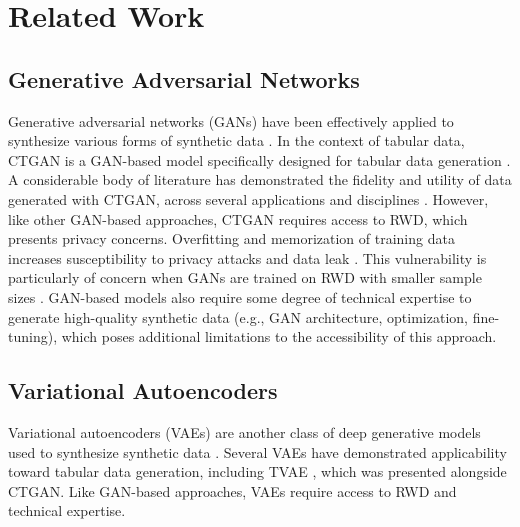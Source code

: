 \section{Related Work}
\subsection{Generative Adversarial Networks}
Generative adversarial networks (GANs) \cite{Goodfellow2014} have been effectively applied to synthesize various forms of synthetic data \cite{Figueira2022, Yi2019}. In the context of tabular data, CTGAN is a GAN-based model specifically designed for tabular data generation \cite{Xu2019}. A considerable body of literature has demonstrated the fidelity and utility of data generated with CTGAN, across several applications and disciplines \cite{Xu2019, Figueira2022, Kang2023, Mendikowski2022}. However, like other GAN-based approaches, CTGAN requires access to RWD, which presents privacy concerns. Overfitting and memorization of training data increases susceptibility to privacy attacks and data leak \cite{Chen2020, Hayes2017}. This vulnerability is particularly of concern when GANs are trained on RWD with smaller sample sizes \cite{Chen2020}. GAN-based models also require some degree of technical expertise to generate high-quality synthetic data (e.g., GAN architecture, optimization, fine-tuning), which poses additional limitations to the accessibility of this approach. 
\subsection{Variational Autoencoders}
Variational autoencoders (VAEs) are another class of deep generative models used to synthesize synthetic data \cite{Kingma2013}. Several VAEs have demonstrated applicability toward tabular data generation, including TVAE \cite{Xu2019}, which was presented alongside CTGAN. Like GAN-based approaches, VAEs require access to RWD and technical expertise.
